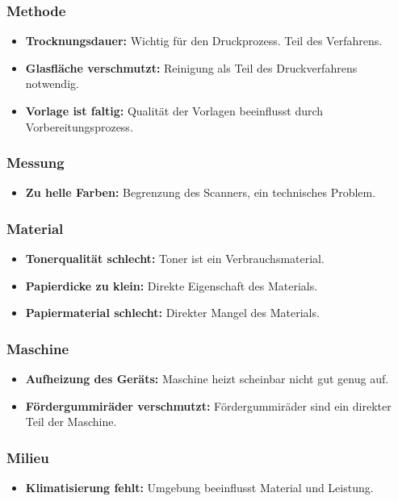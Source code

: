 \documentclass[12pt]{article}
\begin{document}
\subsubsection*{Methode}
\begin{itemize}
	\item \textbf{Trocknungsdauer:} Wichtig für den Druckprozess. Teil des Verfahrens.
	\item \textbf{Glasfläche verschmutzt:} Reinigung als Teil des Druckverfahrens notwendig.
	\item \textbf{Vorlage ist faltig:} Qualität der Vorlagen beeinflusst durch Vorbereitungsprozess.
\end{itemize}

\subsubsection*{Messung}
\begin{itemize}
	\item \textbf{Zu helle Farben:} Begrenzung des Scanners, ein technisches Problem.
\end{itemize}

\subsubsection*{Material}
\begin{itemize}
	\item \textbf{Tonerqualität schlecht:} Toner ist ein Verbrauchsmaterial.
	\item \textbf{Papierdicke zu klein:} Direkte Eigenschaft des Materials.
	\item \textbf{Papiermaterial schlecht:} Direkter Mangel des Materials.
\end{itemize}

\subsubsection*{Maschine}
\begin{itemize}
	\item \textbf{Aufheizung des Geräts:} Maschine heizt scheinbar nicht gut genug auf.
	\item \textbf{Fördergummiräder verschmutzt:} Fördergummiräder sind ein direkter Teil der Maschine.
\end{itemize}

\subsubsection*{Milieu}
\begin{itemize}
	\item \textbf{Klimatisierung fehlt:} Umgebung beeinflusst Material und Leistung.
\end{itemize}
\end{document}
